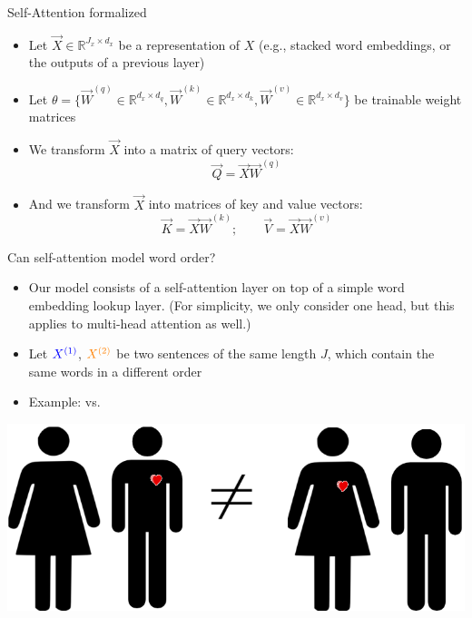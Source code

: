 
\begin{vbframe}{Self-Attention formalized}

\vfill

\begin{itemize}
\item Let $\vec X \in \mathbb{R}^{J_x \times d_x}$ be a representation of $X$ (e.g., stacked word embeddings, or the outputs of a previous layer)
\item Let $\theta = \{\vec W^{(q)} \in \mathbb{R}^{d_x \times d_q}, \vec W^{(k)} \in \mathbb{R}^{d_x \times d_k}, \vec W^{(v)} \in \mathbb{R}^{d_x \times d_v}\}$ be trainable weight matrices
\item We transform $\vec X$ into a matrix of query vectors:
$$ \vec Q = \vec X \vec W^{(q)} $$
\item And we transform $\vec X$ into matrices of key and value vectors:
$$ \vec K = \vec X \vec W^{(k)} ; \qquad \vec V =  \vec X \vec W^{(v)}$$
\end{itemize}

\vfill

\end{vbframe}


\begin{vbframe}{Can self-attention model word order?}

\vfill

\begin{itemize}
	\item Our model consists of a self-attention layer on top of a simple word embedding lookup layer. (For simplicity, we only consider one head, but this applies to multi-head attention as well.)
	\item Let $\textcolor{blue}{X^{(1)}}$, $\textcolor{orange}{X^{(2)}}$ be two sentences of the same length $J$, which contain the same words in a different order
	\item Example:  vs. 
\end{itemize}
\begin{center}
	\includegraphics[width=.6\textwidth]{figure/mary_loves_john}
\end{center}

\vfill

\end{vbframe}

